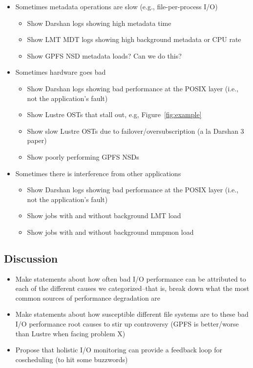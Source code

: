 \documentclass[conference,10pt,compsocconf]{IEEEtran}
\begin{document}
\begin{itemize}
\item Sometimes metadata operations are slow (e.g., file-per-process I/O)
    \begin{itemize}
    \item Show Darshan logs showing high metadata time
    \item Show LMT MDT logs showing high background metadata or CPU rate
    \item Show GPFS NSD metadata loads?  Can we do this?
    \end{itemize}
\item Sometimes hardware goes bad
    \begin{itemize}
    \item Show Darshan logs showing bad performance at the POSIX layer (i.e., not the
    application's fault)
    \item Show Lustre OSTs that stall out, e.g, Figure~\ref{fig:example}
    \item Show slow Lustre OSTs due to failover/oversubscription (a la Darshan 3 paper)
    \item Show poorly performing GPFS NSDs
    \end{itemize}
\item Sometimes there is interference from other applications
    \begin{itemize}
    \item Show Darshan logs showing bad performance at the POSIX layer (i.e., not the
    application's fault)
    \item Show jobs with and without background LMT load
    \item Show jobs with and without background mmpmon load
    \end{itemize}
\end{itemize}

\subsection{Discussion}

\begin{itemize}
\item Make statements about how often bad I/O performance can be attributed to each
of the different causes we categorized--that is, break down what the most
common sources of performance degradation are
\item Make statements about how susceptible different file systems are to these bad
I/O performance root causes to stir up controversy (GPFS is better/worse than
Lustre when facing problem X)
\item Propose that holistic I/O monitoring can provide a feedback loop for
coscheduling (to hit some buzzwords)
\end{itemize}
\end{document}
